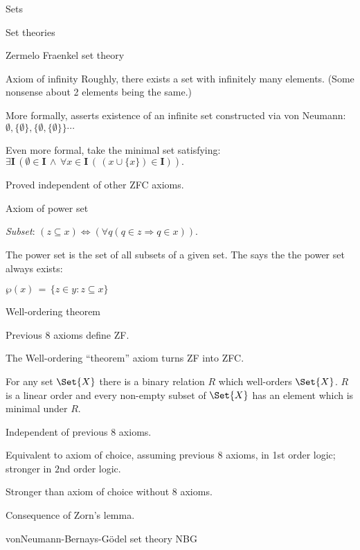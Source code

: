 \begin{plSection}{Sets}
\begin{plSection}{Set theories}
\begin{plSection}{Zermelo Fraenkel set theory}
\begin{plSection}{Axiom of infinity}
Roughly, there exists a set with infinitely many 
elements\cite{wiki:AxiomOfInfinity}.
(Some nonsense about 2 elements being the same.)

More formally, asserts existence of an infinite set 
constructed via von Neumann:
$\emptyset, \{\emptyset\}, \{ \emptyset, \{\emptyset\} \} \cdots$

Even more formal, take the minimal set satisfying:
${\displaystyle 
\exists \mathbf {I}
 \,(\emptyset \in \mathbf {I}
 \,\land \,
 \forall x\in \mathbf {I} \,
 (\,(x\cup \{x\})\in \mathbf {I} )).}$
 
 Proved independent of other \textsf{ZFC} axioms.
 
\end{plSection}%
\begin{plSection}{Axiom of power set}
\label{sec:Axiom-of-power-set}

\textsl{Subset}:
$(z\subseteq x)
 \Leftrightarrow 
 (\forall q(q\in z\Rightarrow q\in x)).$
 
The power set is the set of all subsets of a given set.
The  says the the power set
always exists\cite{wiki:AxiomOfPowerSet}:

${\displaystyle \wp(x) \,=\, \{z\in y:z\subseteq x\}}$

\end{plSection}%
\begin{plSection}{Well-ordering theorem}
\label{sec:Well_ordering_theorem}

Previous 8 axioms define \textsf{ZF}.

The Well-ordering ``theorem'' axiom turns \textsf{ZF}
into \textsf{ZFC}\cite{wiki:WellOrderingTheorem}.

For any set $\Set{X}$ there is a binary relation $R$ which
 well-orders $\Set{X}$.
 $R$ is a linear order and every non-empty subset of $\Set{X}$
 has an element which is minimal under $R$.

Independent of previous 8 axioms.

Equivalent to axiom of choice\cite{wiki:AxiomOfChoice}, 
assuming previous 8 axioms, in 1st order logic;
stronger in $2$nd order logic.

Stronger than axiom of choice without 8 axioms.

Consequence of Zorn's lemma\cite{wiki:ZornsLemma}.
\end{plSection}%
\end{plSection}%
\begin{plSection}{vonNeumann-Bernays-G\"{o}del set theory}
\label{vonNeumann-Bernays-Godel_set_theory}
\textsf{NBG}\cite{wiki:NBGSetTheory}


\end{plSection}
\end{plSection}
\end{plSection}
